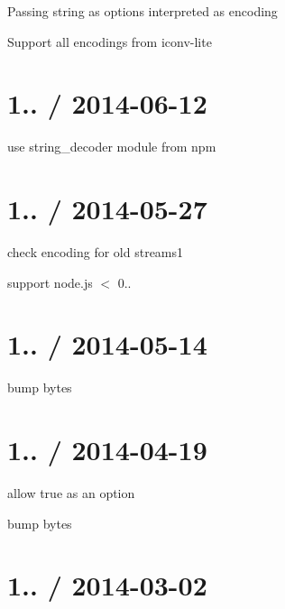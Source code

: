 \begin{DoxyItemize}
\item Passing string as {\ttfamily options} interpreted as encoding
\item Support all encodings from {\ttfamily iconv-\/lite}
\end{DoxyItemize}

\section*{1.. / 2014-\/06-\/12 }


\begin{DoxyItemize}
\item use {\ttfamily string\+\_\+decoder} module from npm
\end{DoxyItemize}

\section*{1.. / 2014-\/05-\/27 }


\begin{DoxyItemize}
\item check encoding for old streams1
\item support node.\+js $<$ 0..
\end{DoxyItemize}

\section*{1.. / 2014-\/05-\/14 }


\begin{DoxyItemize}
\item bump bytes
\end{DoxyItemize}

\section*{1.. / 2014-\/04-\/19 }


\begin{DoxyItemize}
\item allow true as an option
\item bump bytes
\end{DoxyItemize}

\section*{1.. / 2014-\/03-\/02 }


